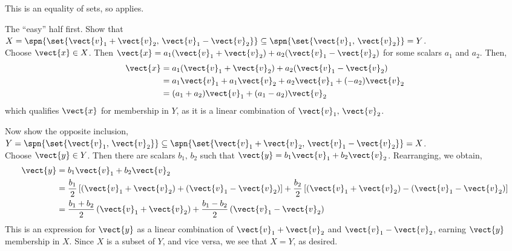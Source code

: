 This is an equality of sets, so  applies.\par
%
The ``easy'' half first.  Show that $X=\spn{\set{\vect{v}_1+\vect{v}_2,\,\vect{v}_1-\vect{v}_2}}\subseteq
\spn{\set{\vect{v}_1,\,\vect{v}_2}}=Y$.\\
%
Choose $\vect{x}\in X$.  Then 
$\vect{x}=a_1(\vect{v}_1+\vect{v}_2)+a_2(\vect{v}_1-\vect{v}_2)$ for some scalars $a_1$ and $a_2$.  Then,
%
\begin{align*}
\vect{x}
&=a_1(\vect{v}_1+\vect{v}_2)+a_2(\vect{v}_1-\vect{v}_2)\\
&=a_1\vect{v}_1+a_1\vect{v}_2+a_2\vect{v}_1+(-a_2)\vect{v}_2\\
&=(a_1+a_2)\vect{v}_1+(a_1-a_2)\vect{v}_2
\end{align*}
%
which qualifies $\vect{x}$ for membership in $Y$, as it is a linear combination of $\vect{v}_1,\,\vect{v}_2$.\par
%
Now show the opposite inclusion, $Y=\spn{\set{\vect{v}_1,\,\vect{v}_2}}\subseteq\spn{\set{\vect{v}_1+\vect{v}_2,\,\vect{v}_1-\vect{v}_2}}=X$.\\
%
Choose $\vect{y}\in Y$.  Then there are scalars $b_1,\,b_2$ such that $ \vect{y}=b_1\vect{v}_1+b_2\vect{v}_2 $.  Rearranging, we obtain,
%
\begin{align*}
\vect{y}
&=b_1\vect{v}_1+b_2\vect{v}_2\\
%
&=\frac{b_1}{2}\left[\left(\vect{v}_1+\vect{v}_2\right)+\left(\vect{v}_1-\vect{v}_2\right)\right]
     +
\frac{b_2}{2}\left[\left(\vect{v}_1+\vect{v}_2\right)-\left(\vect{v}_1-\vect{v}_2\right)\right]\\
%
&=\frac{b_1+b_2}{2}\left(\vect{v}_1+\vect{v}_2\right)+\frac{b_1-b_2}{2}\left(\vect{v}_1-\vect{v}_2\right)
%
\end{align*}
%
This is an expression for $\vect{y}$ as a linear combination of $\vect{v}_1+\vect{v}_2$ and $\vect{v}_1-\vect{v}_2$, earning $\vect{y}$ membership in $X$.
%
Since $X$ is a subset of $Y$, and vice versa, we see that $X=Y$, as desired.